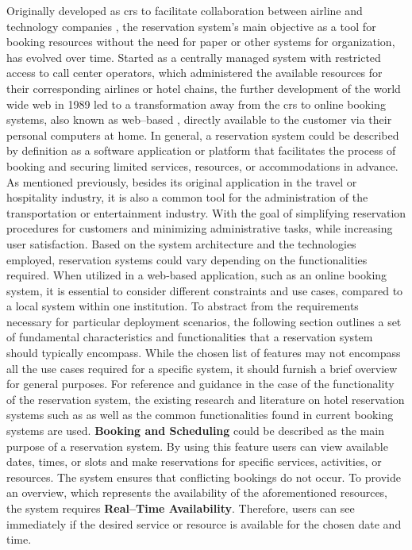 Originally developed as \acrfull{crs} to facilitate collaboration between airline and technology companies \cite{xiang_evolution_2020}, the reservation system's main objective as a tool for booking resources without the need for paper or other systems for organization, has evolved over time.
Started as a centrally managed system with restricted access to call center operators, which administered the available resources for their corresponding airlines or hotel chains, the further development of the world wide web in 1989 led to a transformation away from the \acrshort{crs} to online booking systems, also known as web--based , directly available to the customer via their personal computers at home.
In general, a reservation system could be described by definition as a software application or platform that facilitates the process of booking and securing limited services, resources, or accommodations in advance. 
As mentioned previously, besides its original application in the travel or hospitality industry, it is also a common tool for the administration of the transportation or entertainment industry. With the goal of simplifying reservation procedures for customers and minimizing administrative tasks, while increasing user satisfaction.
Based on the system architecture and the technologies employed, reservation systems could vary depending on the functionalities required. When utilized in a web-based application, such as an online booking system, it is essential to consider different constraints and use cases, compared to a local system within one institution. 
To abstract from the requirements necessary for particular deployment scenarios, the following section outlines a set of fundamental characteristics and functionalities that a reservation system should typically encompass. While the chosen list of features may not encompass all the use cases required for a specific system, it should furnish a brief overview for general purposes.
For reference and guidance in the case of the functionality of the reservation system, the existing research and literature on hotel reservation systems such as \cite{delizo_online_2013,bemile_online_nodate} as well as the common functionalities found in current booking systems are used.
\textbf{Booking and Scheduling} could be described as the main purpose of a reservation system. By using this feature users can view available dates, times, or slots and make reservations for specific services, activities, or resources. The system ensures that conflicting bookings do not occur.
To provide an overview, which represents the availability of the aforementioned resources, the system requires \textbf{Real--Time Availability}. Therefore, users can see immediately if the desired service or resource is available for the chosen date and time.
